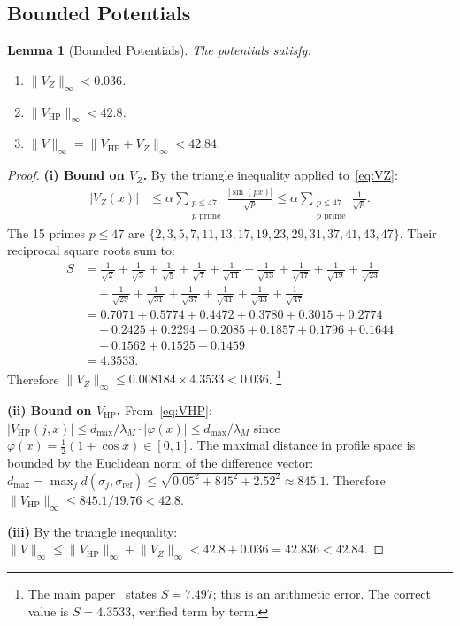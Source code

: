\documentclass[11pt,a4paper]{article}
\theoremstyle{plain}
\newtheorem{lemma}[theorem]{Lemma}
\theoremstyle{remark}
\newcommand{\norm}[1]{\lVert #1 \rVert}
\begin{document}
\subsection{Bounded Potentials}

\begin{lemma}[Bounded Potentials]\label{lem:bounded}
The potentials satisfy:
\begin{enumerate}[nosep,label=(\roman*)]
  \item $\norm{V_Z}_\infty<0.036$.
  \item $\norm{V_{\mathrm{HP}}}_\infty<42.8$.
  \item $\norm{V}_\infty=\norm{V_{\mathrm{HP}}+V_Z}_\infty<42.84$.
\end{enumerate}
\end{lemma}

\begin{proof}
\textbf{(i) Bound on $V_Z$.}
By the triangle inequality applied to~\eqref{eq:VZ}:
\begin{align}
  |V_Z(x)|&\leq\alpha\sum_{\substack{p\leq 47\\p\text{ prime}}}
  \frac{|\sin(px)|}{\sqrt{p}}
  \leq\alpha\sum_{\substack{p\leq 47\\p\text{ prime}}}\frac{1}{\sqrt{p}}.
  \label{eq:VZ-bound}
\end{align}
The 15 primes $p\leq 47$ are $\{2,3,5,7,11,13,17,19,23,29,31,37,41,43,47\}$.
Their reciprocal square roots sum to:
\begin{align*}
  S&=\frac{1}{\sqrt{2}}+\frac{1}{\sqrt{3}}+\frac{1}{\sqrt{5}}
  +\frac{1}{\sqrt{7}}+\frac{1}{\sqrt{11}}+\frac{1}{\sqrt{13}}
  +\frac{1}{\sqrt{17}}+\frac{1}{\sqrt{19}}+\frac{1}{\sqrt{23}}\\
  &\quad+\frac{1}{\sqrt{29}}+\frac{1}{\sqrt{31}}+\frac{1}{\sqrt{37}}
  +\frac{1}{\sqrt{41}}+\frac{1}{\sqrt{43}}+\frac{1}{\sqrt{47}}\\
  &=0.7071+0.5774+0.4472+0.3780+0.3015+0.2774\\
  &\quad+0.2425+0.2294+0.2085+0.1857+0.1796+0.1644\\
  &\quad+0.1562+0.1525+0.1459\\
  &=4.3533.
\end{align*}
Therefore $\norm{V_Z}_\infty\leq 0.008184\times 4.3533<0.036$.%
\footnote{The main paper~\cite{main-paper} states $S=7.497$; this is an
arithmetic error.  The correct value is $S=4.3533$, verified term by term.}

\textbf{(ii) Bound on $V_{\mathrm{HP}}$.}
From~\eqref{eq:VHP}:
$|V_{\mathrm{HP}}(j,x)|\leq d_{\max}/\lambda_M\cdot|\varphi(x)|
\leq d_{\max}/\lambda_M$
since $\varphi(x)=\tfrac{1}{2}(1+\cos x)\in[0,1]$.  The maximal distance
in profile space is bounded by the Euclidean norm of the difference vector:
$d_{\max}=\max_j d(\sigma_j,\sigma_{\mathrm{ref}})
\leq\sqrt{0.05^2+845^2+2.52^2}\approx 845.1$.
Therefore $\norm{V_{\mathrm{HP}}}_\infty\leq 845.1/19.76<42.8$.

\textbf{(iii)} By the triangle inequality:
$\norm{V}_\infty\leq\norm{V_{\mathrm{HP}}}_\infty+\norm{V_Z}_\infty
<42.8+0.036=42.836<42.84$.
\end{proof}
\end{document}
